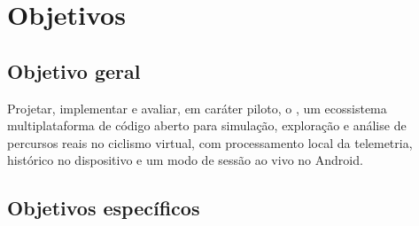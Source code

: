\section{Objetivos}
\label{sec:objetivos}

\subsection{Objetivo geral}
\label{sec:objetivo-geral}

Projetar, implementar e avaliar, em caráter piloto, o \argus{}, um ecossistema
multiplataforma de código aberto para simulação, exploração e análise de
percursos reais no ciclismo virtual, com processamento local da telemetria,
histórico no dispositivo e um modo de sessão ao vivo no Android.

\subsection{Objetivos específicos}
\label{sec:objetivos-especificos}

